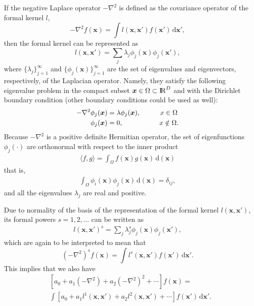 If the negative Laplace operator $-\nabla^2$ is defined as the covariance operator of the formal kernel $l$,
%
\begin{equation*}
-\nabla^2 f(\bm{x}) = \int l(\bm{x},\bm{x}') f(\bm{x}') \,\mathrm{d}\bm{x}',
\end{equation*} 
then the formal kernel can be represented as 
%
\begin{equation*}
l(\bm{x},\bm{x}')= \sum_j \lambda_j \phi_j(\bm{x}) \phi_j(\bm{x}'),
\end{equation*}
where $\{\lambda_j\}_{j=1}^{\infty}$ and $\{\phi_j(\bm{x})\}_{j=1}^{\infty}$ are the set of eigenvalues and eigenvectors, respectively, of the Laplacian operator. Namely, they satisfy the following eigenvalue problem in the compact subset $\bm{x} \in \Omega \subset {\rm I\!R}^D$ and with the Dirichlet boundary condition (other boundary conditions could be used as well):
%
\begin{align*}
-\nabla^2 \phi_j(\bm{x})&=\lambda \phi_j(\bm{x}), \hspace{1cm}  x\in \Omega \nonumber \\ 
\phi_j(\bm{x})&=0, \hspace{1.85cm} x\notin \Omega.
\end{align*}  
Because $-\nabla^2$ is a positive definite Hermitian operator, the set of eigenfunctions $\phi_j(\cdot)$ are orthonormal with respect to the inner product
%
\begin{align*}
\langle f,g \rangle=\int_\Omega f(\bm{x}) g(\bm{x}) \,\mathrm{d}(\bm{x})
\end{align*} 
that is,
%
\begin{align*}
\int_\Omega \phi_i(\bm{x}) \phi_j(\bm{x}) \,\mathrm{d}(\bm{x}) = \delta_{ij},
\end{align*} 
and all the eigenvalues $\lambda_j$ are real and positive. 

Due to normality of the basis of the representation of the formal kernel $l(\bm{x},\bm{x}')$, its formal powers $s=1,2,\dots$ can be written as
%
\begin{eqnarray}\label{eq_formalkernel}
l(\bm{x},\bm{x}')^s= \sum_j \lambda_j^s \phi_j(\bm{x}) \phi_j(\bm{x}'),
\end{eqnarray} 
which are again to be interpreted to mean that
%
\begin{equation*}
(-\nabla^2)^s f(\bm{x}) = \int l^s(\bm{x},\bm{x}') f(\bm{x}') \,\mathrm{d}\bm{x}'.
\end{equation*} 
This implies that we also have
%
\begin{align*}
&[a_0+a_1(-\nabla^2)+a_2(-\nabla^2)^2+\cdots] f(\bm{x}) = \\
& \int [a_0+a_1l^1(\bm{x},\bm{x}')+a_2l^2(\bm{x},\bm{x}')+\cdots] f(\bm{x}')  \,\mathrm{d}\bm{x}'.
\end{align*} 


